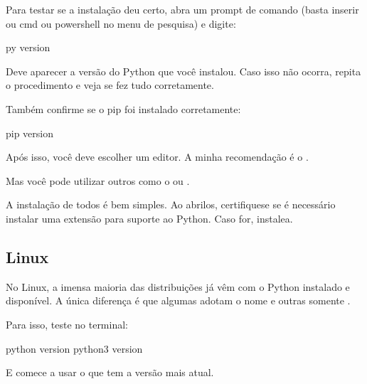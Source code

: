 \documentclass[letterpaper,10pt,english]{jupyterBook}
\begin{document}
\sphinxAtStartPar
Para testar se a instalação deu certo, abra um prompt de comando (basta inserir ou cmd ou powershell no menu de pesquisa) e digite:

\begin{sphinxVerbatim}[commandchars=\\\{\}]
py \PYGZhy{}\PYGZhy{}version
\end{sphinxVerbatim}

\sphinxAtStartPar
Deve aparecer a versão do Python que você instalou. Caso isso não ocorra, repita o procedimento e veja se fez tudo corretamente.

\sphinxAtStartPar
Também confirme se o pip foi instalado corretamente:

\begin{sphinxVerbatim}[commandchars=\\\{\}]
pip \PYGZhy{}\PYGZhy{}version
\end{sphinxVerbatim}

\sphinxAtStartPar
Após isso, você deve escolher um editor. A minha recomendação é o .

\sphinxAtStartPar
Mas você pode utilizar outros como o  ou .

\sphinxAtStartPar
A instalação de todos é bem simples. Ao abri\sphinxhyphen{}los, certifique\sphinxhyphen{}se se é necessário instalar uma extensão para suporte ao Python. Caso for, instale\sphinxhyphen{}a.


\subsection{Linux}
\label{\detokenize{chapters/1:id2}}
\sphinxAtStartPar
No Linux, a imensa maioria das distribuições já vêm com o Python instalado e disponível. A única diferença é que algumas adotam o nome  e outras somente .

\sphinxAtStartPar
Para isso, teste no terminal:

\begin{sphinxVerbatim}[commandchars=\\\{\}]
python \PYGZhy{}\PYGZhy{}version
python3 \PYGZhy{}\PYGZhy{}version
\end{sphinxVerbatim}

\sphinxAtStartPar
E comece a usar o que tem a versão mais atual.
\end{document}
